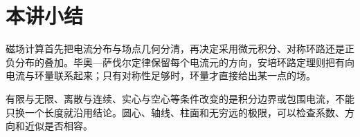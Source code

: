 \section{本讲小结}
磁场计算首先把电流分布与场点几何分清，再决定采用微元积分、对称环路还是正负分布的叠加。毕奥—萨伐尔定律保留每个电流元的方向，安培环路定理则把有向电流与环量联系起来；只有对称性足够时，环量才直接给出某一点的场。

有限与无限、离散与连续、实心与空心等条件改变的是积分边界或包围电流，不能只换一个长度就沿用结论。圆心、轴线、柱面和无穷远的极限，可以检查系数、方向和近似是否相容。
